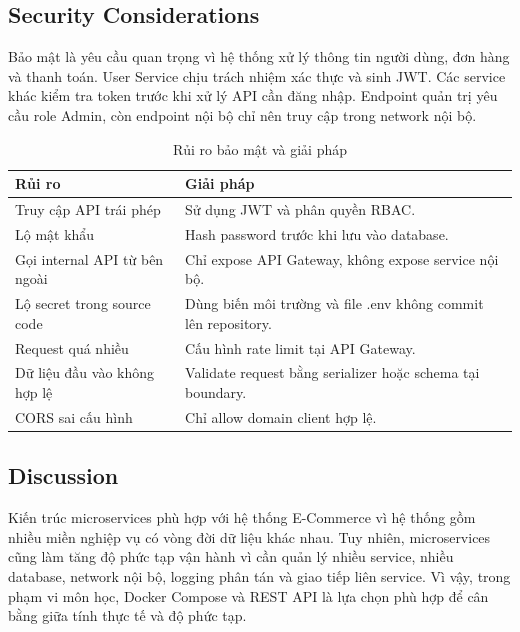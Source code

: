 \documentclass[../main.tex]{subfiles}
\begin{document}
\subsection{Security Considerations}
\label{subsection:4.2.8}

Bảo mật là yêu cầu quan trọng vì hệ thống xử lý thông tin người dùng, đơn hàng và thanh toán. User Service chịu trách nhiệm xác thực và sinh JWT. Các service khác kiểm tra token trước khi xử lý API cần đăng nhập. Endpoint quản trị yêu cầu role Admin, còn endpoint nội bộ chỉ nên truy cập trong network nội bộ.

\begin{table}[H]
    \centering
    \caption{Rủi ro bảo mật và giải pháp}
    \label{tab:chapter4-security-risks}
    \begin{tabular}{|p{}|p{}|}
        \hline
        \rowcolor{primary!35}
        \textbf{Rủi ro} & \textbf{Giải pháp} \\
        \hline
        Truy cập API trái phép & Sử dụng JWT và phân quyền RBAC. \\
        \hline
        Lộ mật khẩu & Hash password trước khi lưu vào database. \\
        \hline
        Gọi internal API từ bên ngoài & Chỉ expose API Gateway, không expose service nội bộ. \\
        \hline
        Lộ secret trong source code & Dùng biến môi trường và file .env không commit lên repository. \\
        \hline
        Request quá nhiều & Cấu hình rate limit tại API Gateway. \\
        \hline
        Dữ liệu đầu vào không hợp lệ & Validate request bằng serializer hoặc schema tại boundary. \\
        \hline
        CORS sai cấu hình & Chỉ allow domain client hợp lệ. \\
        \hline
    \end{tabular}
\end{table}

\subsection{Discussion}
\label{subsection:4.2.9}

Kiến trúc microservices phù hợp với hệ thống E-Commerce vì hệ thống gồm nhiều miền nghiệp vụ có vòng đời dữ liệu khác nhau. Tuy nhiên, microservices cũng làm tăng độ phức tạp vận hành vì cần quản lý nhiều service, nhiều database, network nội bộ, logging phân tán và giao tiếp liên service. Vì vậy, trong phạm vi môn học, Docker Compose và REST API là lựa chọn phù hợp để cân bằng giữa tính thực tế và độ phức tạp.
\end{document}

